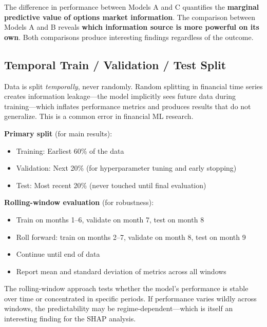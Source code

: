 \documentclass[11pt,a4paper]{article}
\begin{document}
\begin{keyinsight}
The difference in performance between Models A and C quantifies the \textbf{marginal predictive value of options market information}. The comparison between Models A and B reveals \textbf{which information source is more powerful on its own}. Both comparisons produce interesting findings regardless of the outcome.
\end{keyinsight}

\subsection{Temporal Train / Validation / Test Split}

\begin{warningbox}
Data is split \emph{temporally}, never randomly. Random splitting in financial time series creates information leakage---the model implicitly sees future data during training---which inflates performance metrics and produces results that do not generalize. This is a common error in financial ML research.
\end{warningbox}

\textbf{Primary split} (for main results):
\begin{itemize}[nosep]
    \item Training: Earliest 60\% of the data
    \item Validation: Next 20\% (for hyperparameter tuning and early stopping)
    \item Test: Most recent 20\% (never touched until final evaluation)
\end{itemize}

\textbf{Rolling-window evaluation} (for robustness):
\begin{itemize}[nosep]
    \item Train on months 1--6, validate on month 7, test on month 8
    \item Roll forward: train on months 2--7, validate on month 8, test on month 9
    \item Continue until end of data
    \item Report mean and standard deviation of metrics across all windows
\end{itemize}

The rolling-window approach tests whether the model's performance is stable over time or concentrated in specific periods. If performance varies wildly across windows, the predictability may be regime-dependent---which is itself an interesting finding for the SHAP analysis.
\end{document}
